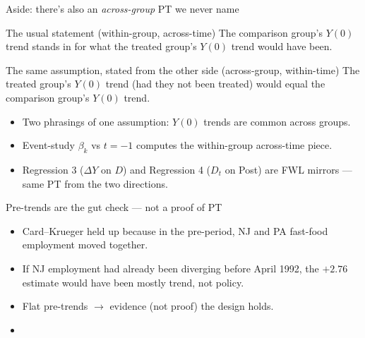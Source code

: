 \documentclass[aspectratio=169,11pt]{beamer}
\begin{document}
\begin{frame}{Aside: there's also an \textit{across-group} PT we never name}
\scriptsize
\begin{block}{The usual statement (within-group, across-time)}
The comparison group's $Y(0)$ trend stands in for what the treated group's $Y(0)$ trend would have been.
\end{block}
\begin{block}{The same assumption, stated from the other side (across-group, within-time)}
The treated group's $Y(0)$ trend (had they not been treated) would equal the comparison group's $Y(0)$ trend.
\end{block}
\begin{itemize}\setlength\itemsep{1pt}
  \item Two phrasings of one assumption: $Y(0)$ trends are common across groups.
  \item Event-study $\beta_k$ vs $t=-1$ computes the within-group across-time piece.
  \item Regression 3 ($\Delta Y$ on $D$) and Regression 4 ($D_t$ on Post) are FWL mirrors --- same PT from the two directions.
\end{itemize}
\end{frame}

\begin{frame}{Pre-trends are the gut check --- not a proof of PT}
\vspace{0.4em}
\begin{itemize}
  \item Card--Krueger held up because in the pre-period, NJ and PA fast-food employment moved together.
  \item If NJ employment had already been diverging before April 1992, the $+2.76$ estimate would have been mostly trend, not policy.
  \item Flat pre-trends $\rightarrow$ evidence (not proof) the design holds.
  \item {}
\end{itemize}
\vspace{0.4em}
\end{frame}
\end{document}
